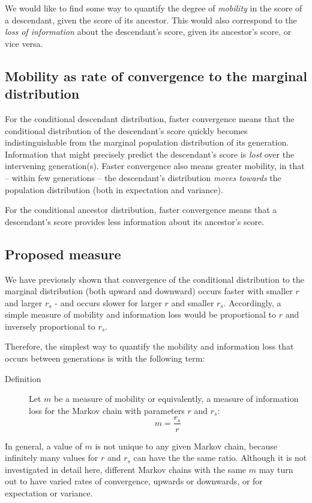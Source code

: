 \documentclass[letterpaper,10pt]{article} %
\begin{document}
We would like to find some way to quantify the degree of \emph{mobility} in the score of a descendant, given the score of its ancestor. This would also correspond to the \emph{loss of information} about the descendant's score, given its ancestor's score, or vice versa.

\subsection{Mobility as rate of convergence to the marginal distribution}
For the conditional descendant distribution, faster convergence means that the conditional distribution of the descendant's score quickly becomes indistinguishable from the marginal population distribution of its generation. Information that might precisely predict the descendant's score is \emph{lost} over the intervening generation(s). Faster convergence also means greater mobility, in that -- within few generations -- the descendant's distribution \emph{moves towards} the population distribution (both in expectation and variance). 

For the conditional ancestor distribution, faster convergence means that a descendant's score provides less information about its ancestor's score. 

\subsection{Proposed measure}
We have previously shown that convergence of the conditional distribution to the marginal distribution (both upward and downward) occurs faster with smaller $r$ and larger $r_s$ - and occurs slower for larger $r$ and smaller $r_s$. Accordingly, a simple measure of mobility and information loss would be proportional to $r$ and inversely proportional to $r_s$. 

Therefore, the simplest way to quantify the mobility and information loss that occurs between generations is with the following term:

\begin{description}
\item [Definition] Let $m$ be a measure of mobility or equivalently, a measure of information loss for the Markov chain with parameters $r$ and $r_s$:
$$m = \frac{r_s}{r}$$
\end{description}

In general, a value of $m$ is not unique to any given Markov chain, because infinitely many values for $r$ and $r_s$ can have the the same ratio. Although it is not investigated in detail here, different Markov chains with the same $m$ may turn out to have varied rates of convergence, upwards or downwards, or for expectation or variance. 
\end{document}
